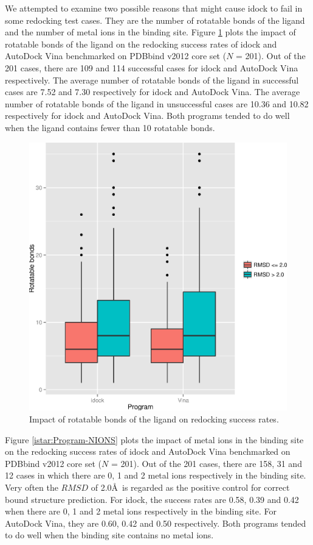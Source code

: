 We attempted to examine two possible reasons that might cause idock to fail in some redocking test cases. They are the number of rotatable bonds of the ligand and the number of metal ions in the binding site. Figure \ref{istar:Program-NRB} plots the impact of rotatable bonds of the ligand on the redocking success rates of idock and AutoDock Vina benchmarked on PDBbind v2012 core set ($N$ = 201). Out of the 201 cases, there are 109 and 114 successful cases for idock and AutoDock Vina respectively. The average number of rotatable bonds of the ligand in successful cases are 7.52 and 7.30 respectively for idock and AutoDock Vina. The average number of rotatable bonds of the ligand in unsuccessful cases are 10.36 and 10.82 respectively for idock and AutoDock Vina. Both programs tended to do well when the ligand contains fewer than 10 rotatable bonds.

\begin{figure}
\begin{center}
\includegraphics[width=\linewidth]{../istar/Program-NRB.eps}
\end{center}
\caption{Impact of rotatable bonds of the ligand on redocking success rates.}
\label{istar:Program-NRB}
\end{figure}

Figure \ref{istar:Program-NIONS} plots the impact of metal ions in the binding site on the redocking success rates of idock and AutoDock Vina benchmarked on PDBbind v2012 core set ($N$ = 201). Out of the 201 cases, there are 158, 31 and 12 cases in which there are 0, 1 and 2 metal ions respectively in the binding site. Very often the $RMSD$ of 2.0\AA\ is regarded as the positive control for correct bound structure prediction. For idock, the success rates are 0.58, 0.39 and 0.42 when there are 0, 1 and 2 metal ions respectively in the binding site. For AutoDock Vina, they are 0.60, 0.42 and 0.50 respectively. Both programs tended to do well when the binding site contains no metal ions.

